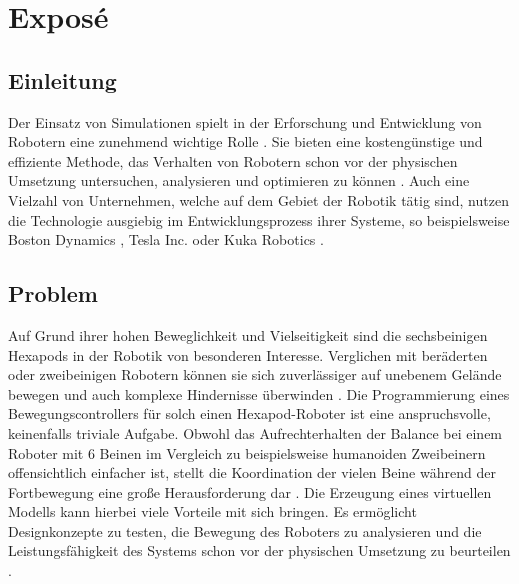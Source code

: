 \chapter{Exposé}
\label{ch:expose}



\section{Einleitung}
Der Einsatz von Simulationen spielt in der Erforschung und Entwicklung von Robotern eine zunehmend wichtige Rolle \parencite{afzal2020study}. 
Sie bieten eine kostengünstige und effiziente Methode, das Verhalten von Robotern schon vor der physischen Umsetzung untersuchen, analysieren und optimieren zu können \parencite{de2019analysis}. 
Auch eine Vielzahl von Unternehmen, welche auf dem Gebiet der Robotik tätig sind, nutzen die Technologie ausgiebig im Entwicklungsprozess ihrer Systeme, so beispielsweise Boston Dynamics \parencite{BostonDynamicsSimulation}, Tesla Inc. \parencite{TeslaAiDay2022} oder Kuka Robotics \parencite{KukaSim}.

\section{Problem}
Auf Grund ihrer hohen Beweglichkeit und Vielseitigkeit sind die sechsbeinigen Hexapods in der Robotik von besonderen Interesse. 
Verglichen mit beräderten oder zweibeinigen Robotern können sie sich zuverlässiger auf unebenem Gelände bewegen und auch komplexe Hindernisse überwinden \parencite{barai2013smart, atifystructure}.
Die Programmierung eines Bewegungscontrollers für solch einen Hexapod-Roboter ist eine anspruchsvolle, keinenfalls triviale Aufgabe.
Obwohl das Aufrechterhalten der Balance bei einem Roboter mit 6 Beinen im Vergleich zu beispielsweise humanoiden Zweibeinern offensichtlich einfacher ist, stellt die Koordination der vielen Beine während der Fortbewegung eine große Herausforderung dar \parencite{azayev2020blind,schilling2013walknet}.
Die Erzeugung eines virtuellen Modells kann hierbei viele Vorteile mit sich bringen.
Es ermöglicht Designkonzepte zu testen, die Bewegung des Roboters zu analysieren und die Leistungsfähigkeit des Systems schon vor der physischen Umsetzung zu beurteilen \parencite{de2019analysis}.

